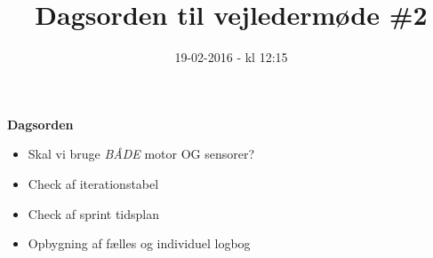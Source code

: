 \documentclass{article}
\title{Dagsorden til vejledermøde \#2}
\date{19-02-2016 - kl 12:15}
\begin{document}
	\maketitle
	\textbf{Dagsorden}
	
	\begin{itemize}
		\item Skal vi bruge \textit{BÅDE} motor OG sensorer?
		\item Check af iterationstabel
		\item Check af sprint tidsplan
		\item Opbygning af fælles og individuel logbog
	\end{itemize}
\end{document}
